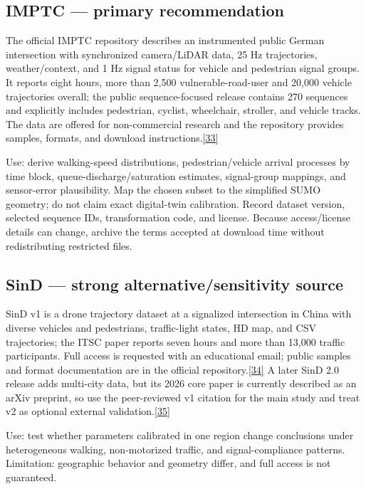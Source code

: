 \documentclass[
  english,
  11pt,
  a4paper,
]{article}
\begin{document}
\subsection{IMPTC --- primary
recommendation}\label{imptc-primary-recommendation}

The official IMPTC repository describes an instrumented public German
intersection with synchronized camera/LiDAR data, 25 Hz trajectories,
weather/context, and 1 Hz signal status for vehicle and pedestrian
signal groups. It reports eight hours, more than 2,500
vulnerable-road-user and 20,000 vehicle trajectories overall; the public
sequence-focused release contains 270 sequences and explicitly includes
pedestrian, cyclist, wheelchair, stroller, and vehicle tracks. The data
are offered for non-commercial research and the repository provides
samples, formats, and download instructions.\hyperref[source-33]{[33]}

Use: derive walking-speed distributions, pedestrian/vehicle arrival
processes by time block, queue-discharge/saturation estimates,
signal-group mappings, and sensor-error plausibility. Map the chosen
subset to the simplified SUMO geometry; do not claim exact digital-twin
calibration. Record dataset version, selected sequence IDs,
transformation code, and license. Because access/license details can
change, archive the terms accepted at download time without
redistributing restricted files.

\subsection{SinD --- strong alternative/sensitivity
source}\label{sind-strong-alternativesensitivity-source}

SinD v1 is a drone trajectory dataset at a signalized intersection in
China with diverse vehicles and pedestrians, traffic-light states, HD
map, and CSV trajectories; the ITSC paper reports seven hours and more
than 13,000 traffic participants. Full access is requested with an
educational email; public samples and format documentation are in the
official repository.\hyperref[source-34]{[34]} A later SinD 2.0 release
adds multi-city data, but its 2026 core paper is currently described as
an arXiv preprint, so use the peer-reviewed v1 citation for the main
study and treat v2 as optional external
validation.\hyperref[source-35]{[35]}

Use: test whether parameters calibrated in one region change conclusions
under heterogeneous walking, non-motorized traffic, and
signal-compliance patterns. Limitation: geographic behavior and geometry
differ, and full access is not guaranteed.
\end{document}
